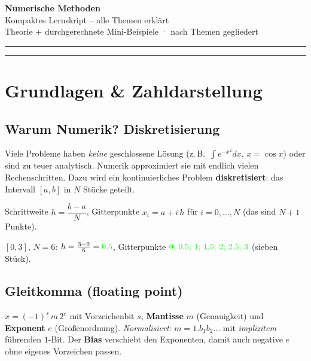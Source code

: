 \documentclass[a4paper,11pt]{article}
\newcommand{\f}[1]{\textcolor{green}{#1}}
\begin{document}
\begin{center}
{\Huge\bfseries\color{accent} Numerische Methoden}\\[4pt]
{\large\color{fgtext} Kompaktes Lernskript -- alle Themen erklärt}\\[2pt]
{\small\color{muted} Theorie + durchgerechnete Mini-Beispiele \;·\; nach Themen gegliedert}
\end{center}

\vspace{6pt}
\noindent\textcolor{rulecol}{\rule{\linewidth}{0.4pt}}

{\color{accent}\tableofcontents}
\noindent\textcolor{rulecol}{\rule{\linewidth}{0.4pt}}

\section{Grundlagen \& Zahldarstellung}

\subsection{Warum Numerik? Diskretisierung}
Viele Probleme haben \emph{keine} geschlossene Lösung (z.\,B.\ $\int e^{-x^2}dx$, $x=\cos x$) oder
sind zu teuer analytisch. Numerik approximiert sie mit endlich vielen Rechenschritten. Dazu wird ein
kontinuierliches Problem \textbf{diskretisiert}: das Intervall $[a,b]$ in $N$ Stücke geteilt.

\begin{formel}[Diskretisierung]
Schrittweite $h=\dfrac{b-a}{N}$, Gitterpunkte $x_i=a+i\,h$ für $i=0,\dots,N$ (das sind $N{+}1$ Punkte).
\end{formel}

\begin{beispiel}
$[0,3]$, $N=6$: $h=\tfrac{3-0}{6}=\f{0{,}5}$, Gitterpunkte $\f{0;\,0{,}5;\,1;\,1{,}5;\,2;\,2{,}5;\,3}$
(sieben Stück).
\end{beispiel}

\subsection{Gleitkomma (floating point)}
\begin{formel}[Gleitkommazahl]
$x=(-1)^s\,m\,2^{e}$ mit Vorzeichenbit $s$, \textbf{Mantisse} $m$ (Genauigkeit) und \textbf{Exponent}
$e$ (Größenordnung). \emph{Normalisiert}: $m=1{.}b_1b_2\dots$ mit \emph{implizitem} führenden $1$-Bit.
Der \textbf{Bias} verschiebt den Exponenten, damit auch negative $e$ ohne eigenes Vorzeichen passen.
\end{formel}
\end{document}

